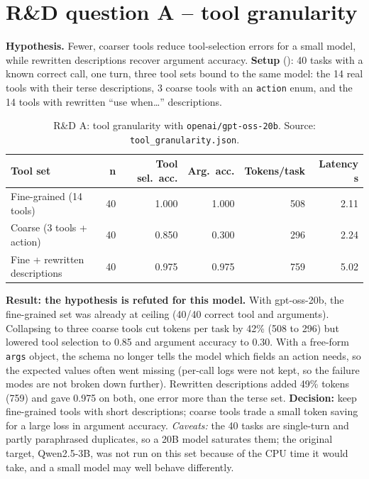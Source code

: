 \documentclass[10pt,a4paper]{article}
\newcommand{\file}[1]{\texttt{\detokenize{#1}}}
\begin{document}
\section{R\&D question A -- tool granularity}
\textbf{Hypothesis.} Fewer, coarser tools reduce tool-selection errors for a small model, while rewritten descriptions recover
argument accuracy. \textbf{Setup} (\file{evals/runners/tool_granularity.py}): 40 tasks with a known correct call, one turn, three
tool sets bound to the same model: the 14 real tools with their terse descriptions, 3 coarse tools with an \texttt{action} enum,
and the 14 tools with rewritten ``use when\ldots'' descriptions.
\begin{table}[t]\centering\small\caption{R\&D A: tool granularity with \texttt{openai/gpt-oss-20b}. Source: \texttt{tool\_granularity.json}.}\label{tab:tools}
\begin{tabular}{lrrrrr}\toprule Tool set & n & Tool sel.\ acc. & Arg.\ acc. & Tokens/task & Latency s\\\midrule
Fine-grained (14 tools) & 40 & 1.000 & 1.000 & 508 & 2.11 \\
Coarse (3 tools + action) & 40 & 0.850 & 0.300 & 296 & 2.24 \\
Fine + rewritten descriptions & 40 & 0.975 & 0.975 & 759 & 5.02 \\
\bottomrule\end{tabular}\end{table}
\textbf{Result: the hypothesis is refuted for this model.} With gpt-oss-20b, the fine-grained set was already at ceiling (40/40 correct
tool and arguments). Collapsing to three coarse tools cut tokens per task by 42\% (508 to 296) but lowered tool selection to 0.85
and argument accuracy to 0.30. With a free-form \texttt{args} object, the schema no longer tells the model which fields an action
needs, so the expected values often went missing (per-call logs were not kept, so the failure modes are not broken down further). Rewritten descriptions added 49\% tokens (759) and gave 0.975 on both, one error more than the terse set. \textbf{Decision:}
keep fine-grained tools with short descriptions; coarse tools trade a small token saving for a large loss in argument
accuracy. \emph{Caveats:} the 40 tasks are single-turn and partly paraphrased duplicates, so a 20B model saturates them; the original
target, Qwen2.5-3B, was not run on this set because of the CPU time it would take, and a small model may well behave differently.
\end{document}
